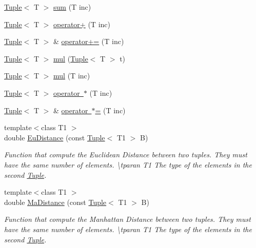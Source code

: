 \begin{DoxyCompactItemize}
\mbox{\hyperlink{class_tuple}{Tuple}}$<$ T $>$ \mbox{\hyperlink{class_tuple_a20daa0804e2bac28949b5abe0cbcc589}{sum}} (T inc)
\item 
\mbox{\hyperlink{class_tuple}{Tuple}}$<$ T $>$ \mbox{\hyperlink{class_tuple_af41b573429ba5d8fc0b5576b7b41e818}{operator+}} (T inc)
\item 
\mbox{\hyperlink{class_tuple}{Tuple}}$<$ T $>$ \& \mbox{\hyperlink{class_tuple_aeace0f594f48529ddf3385cb2f023daf}{operator+=}} (T inc)
\item 
\mbox{\hyperlink{class_tuple}{Tuple}}$<$ T $>$ \mbox{\hyperlink{class_tuple_aa04cadf68dd3658943db047b6fd500fa}{mul}} (\mbox{\hyperlink{class_tuple}{Tuple}}$<$ T $>$ t)
\item 
\mbox{\hyperlink{class_tuple}{Tuple}}$<$ T $>$ \mbox{\hyperlink{class_tuple_ad1de2e1ba86734fb751897138707a603}{mul}} (T inc)
\item 
\mbox{\hyperlink{class_tuple}{Tuple}}$<$ T $>$ \mbox{\hyperlink{class_tuple_ab5bd095731feb7aa39bcf41778eb144f}{operator $\ast$}} (T inc)
\item 
\mbox{\hyperlink{class_tuple}{Tuple}}$<$ T $>$ \& \mbox{\hyperlink{class_tuple_a5dfd14ef6f956b608d6a99bdf0cf9c75}{operator $\ast$=}} (T inc)
\item 
{\footnotesize template$<$class T1 $>$ }\\double \mbox{\hyperlink{class_tuple_a973d6cae203bca0c1ce0d0b65279e433}{Eu\+Distance}} (const \mbox{\hyperlink{class_tuple}{Tuple}}$<$ T1 $>$ B)
\begin{DoxyCompactList}\small\item\em Function that compute the Euclidean Distance between two tuples. They must have the same number of elements. \textbackslash{}tparan T1 The type of the elements in the second \mbox{\hyperlink{class_tuple}{Tuple}}. \end{DoxyCompactList}\item 
{\footnotesize template$<$class T1 $>$ }\\double \mbox{\hyperlink{class_tuple_ac668269743d9be71769c9b4a424c785f}{Ma\+Distance}} (const \mbox{\hyperlink{class_tuple}{Tuple}}$<$ T1 $>$ B)
\begin{DoxyCompactList}\small\item\em Function that compute the Manhattan Distance between two tuples. They must have the same number of elements. \textbackslash{}tparan T1 The type of the elements in the second \mbox{\hyperlink{class_tuple}{Tuple}}. \end{DoxyCompactList}\item 

\end{DoxyCompactItemize}
